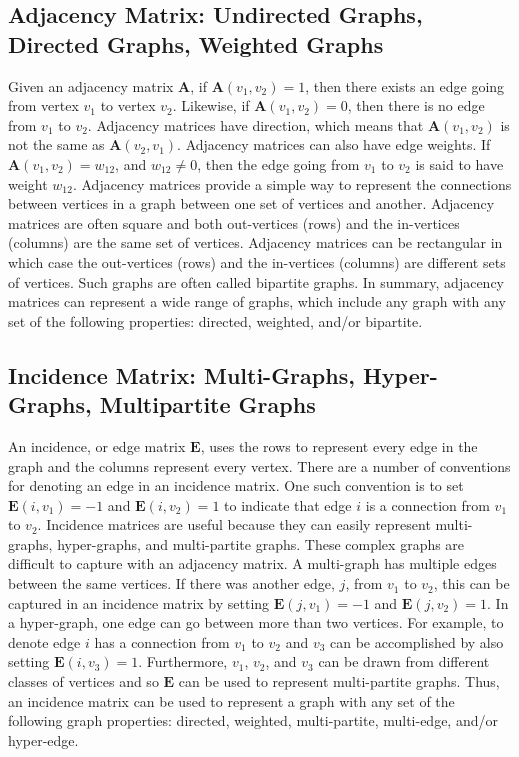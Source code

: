 \subsection{Adjacency Matrix: Undirected Graphs, Directed Graphs, Weighted Graphs}
Given an adjacency matrix $\mathbf{A}$, if $\mathbf{A}(v_1,v_2) = 1$, then there exists an edge going from vertex $v_1$ to vertex $v_2$.  Likewise, if $\mathbf{A}(v_1,v_2) = 0$, then there is no edge from $v_1$ to $v_2$.  Adjacency matrices have direction, which means that $\mathbf{A}(v_1,v_2)$ is not the same as $\mathbf{A}(v_2,v_1)$.  Adjacency matrices can also have edge weights.  If $\mathbf{A}(v_1,v_2) = w_{12}$, and $w_{12} \neq 0$, then the edge going from $v_1$ to $v_2$ is said to have weight $w_{12}$.  Adjacency matrices provide a simple way to represent the connections between vertices in a graph between one set of vertices and another.  Adjacency matrices are often square and both out-vertices (rows) and the in-vertices (columns) are the same set of vertices.  Adjacency matrices can be rectangular in which case the out-vertices (rows) and the in-vertices (columns) are different sets of vertices.  Such graphs are often called bipartite graphs.  In summary, adjacency matrices can represent a wide range of graphs, which include any graph with any set of the following properties: directed, weighted, and/or bipartite.

\subsection{Incidence Matrix: Multi-Graphs, Hyper-Graphs, Multipartite Graphs}
An incidence, or edge matrix $\mathbf{E}$, uses the rows to represent every edge in the graph and the columns represent every vertex.  There are a number of conventions for denoting an edge in an incidence matrix.  One such convention is to set $\mathbf{E}(i,v_1) = -1$ and $\mathbf{E}(i,v_2) = 1$ to indicate that edge $i$ is a connection from $v_1$ to $v_2$.  Incidence matrices are useful because they can easily represent multi-graphs, hyper-graphs, and multi-partite graphs.  These complex graphs are difficult to capture with an adjacency matrix.  A multi-graph has multiple edges between the same vertices.  If there was another edge, $j$, from $v_1$ to $v_2$, this can be captured in an incidence matrix by setting $\mathbf{E}(j,v_1) = -1$ and $\mathbf{E}(j,v_2) = 1$.  In a hyper-graph, one edge can go between more than two vertices.  For example, to denote edge $i$ has a connection from $v_1$ to $v_2$ and $v_3$ can be accomplished by also setting $\mathbf{E}(i,v_3) = 1$.  Furthermore, $v_1$, $v_2$, and $v_3$ can be drawn from  different classes of vertices and so $\mathbf{E}$ can be used to represent multi-partite graphs.  Thus, an incidence matrix can be used to represent a graph with any set of the following graph properties: directed, weighted, multi-partite, multi-edge, and/or hyper-edge.

